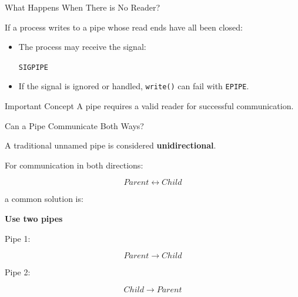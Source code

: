 \documentclass[aspectratio=169]{beamer}
\begin{document}
\begin{frame}{What Happens When There is No Reader?}

If a process writes to a pipe whose read ends have all been closed:

\begin{itemize}
    \item The process may receive the signal:
    \begin{center}
    \Large \texttt{SIGPIPE}
    \end{center}

    \item If the signal is ignored or handled, \texttt{write()} can fail with
    \texttt{EPIPE}.
\end{itemize}

\begin{alertblock}{Important Concept}
A pipe requires a valid reader for successful communication.
\end{alertblock}

\end{frame}

\begin{frame}{Can a Pipe Communicate Both Ways?}

A traditional unnamed pipe is considered \textbf{unidirectional}.

For communication in both directions:

\[
Parent
\leftrightarrow
Child
\]

a common solution is:

\begin{center}
\textbf{Use two pipes}
\end{center}

Pipe 1:

\[
Parent \rightarrow Child
\]

Pipe 2:

\[
Child \rightarrow Parent
\]

\end{frame}
\end{document}
